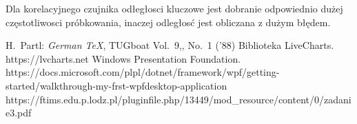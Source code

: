\documentclass[12pt]{article}
\begin{document}
Dla korelacyjnego czujnika odłegłosci kluczowe jest dobranie odpowiednio dużej częstotliwosci próbkowania, inaczej odległosć jest obliczana z dużym błędem.





\begin{thebibliography}{99}
 H.~Partl:
\emph{German \TeX},
TUGboat Vol.~9,, No.~1 ('88)
 Biblioteka LiveCharts. https://lvcharts.net
 Windows Presentation Foundation. https://docs.microsoft.com/plpl/dotnet/framework/wpf/getting-started/walkthrough-my-frst-wpfdesktop-application
 https://ftims.edu.p.lodz.pl/pluginfile.php/13449/mod\_resource/content/0/zadanie3.pdf
\end{thebibliography}
\end{document}
